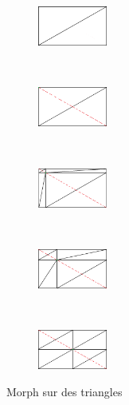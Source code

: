\begin{figure}[H]
    \centering
    \begin{subfigure}[b]{0.17\textwidth}
       \centering \includegraphics[width=\textwidth,height=1.3cm]{img/morph-rectangle5.png}
       \caption{}\label{subfig:morph-rectangle5}
    \end{subfigure}
    ~ 
    \begin{subfigure}[b]{0.17\textwidth}
       \centering \includegraphics[width=\textwidth,height=1.3cm]{img/morph-rectangle4.png}
       \caption{}\label{subfig:morph-rectangle4}
    \end{subfigure}
    ~
    \begin{subfigure}[b]{0.17\textwidth}
       \centering \includegraphics[width=\textwidth,height=1.3cm]{img/morph-rectangle3.png}
       \caption{}\label{subfig:morph-rectangle3}
    \end{subfigure}
    ~
    \begin{subfigure}[b]{0.16\textwidth}
       \centering \includegraphics[width=\textwidth,height=1.3cm]{img/morph-rectangle2.png}
       \caption{}\label{subfig:morph-rectangle2}
    \end{subfigure}
     ~
    \begin{subfigure}[b]{0.16\textwidth}
       \centering \includegraphics[width=\textwidth,height=1.3cm]{img/morph-rectangle1.png}
       \caption{}\label{subfig:morph-rectangle1}
    \end{subfigure}
    \caption{Morph sur des triangles}\label{fig:morph-transition}
\end{figure}



